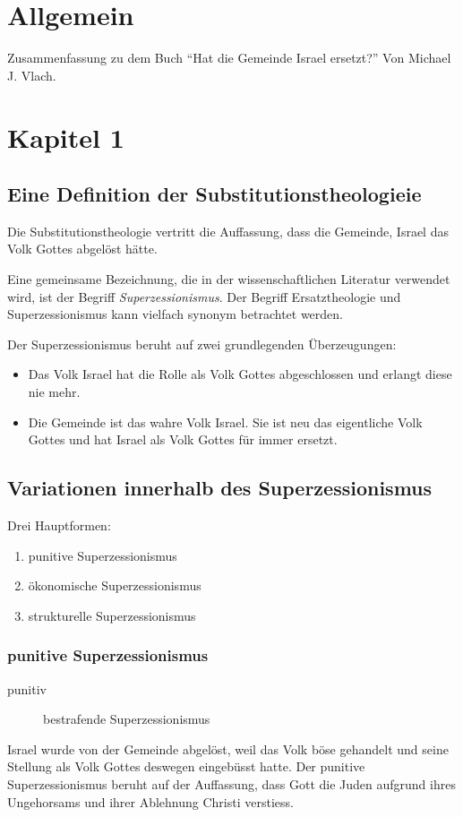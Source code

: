 \documentclass[fontsize=14pt]{../../inc/mybib}
\newcommand{\sz}{Superzessionismus}
\newcommand{\sts}{Substitutionstheologie}
\begin{document}
    \tableofcontents
    \newpage
    \section{Allgemein}
    Zusammenfassung zu dem Buch \enquote{Hat die Gemeinde Israel ersetzt?} Von Michael J. Vlach.
    \section{Kapitel 1}
    \subsection{Eine Definition der \sts{}ie}
    Die Substitutionstheologie vertritt die Auffassung, dass die Gemeinde, Israel das Volk Gottes abgelöst hätte.

    Eine gemeinsame Bezeichnung, die in der wissenschaftlichen Literatur verwendet wird, ist der Begriff \textit{\sz}. Der Begriff Ersatztheologie und \sz{} kann vielfach synonym betrachtet werden.

    Der \sz{} beruht auf zwei grundlegenden Überzeugungen:
    \begin{itemize}
        \item Das Volk Israel hat die Rolle als Volk Gottes abgeschlossen und erlangt diese nie mehr.
        \item Die Gemeinde ist das wahre Volk Israel. Sie ist neu das eigentliche Volk Gottes und hat Israel als Volk Gottes für immer ersetzt.
    \end{itemize}
    \subsection{Variationen innerhalb des \sz{}}
    Drei Hauptformen:
    \begin{enumerate}
        \item punitive \sz
        \item ökonomische \sz
        \item strukturelle \sz
    \end{enumerate}
    \subsubsection{punitive \sz}
    \begin{description}
        \item[punitiv] bestrafende \sz 
    \end{description}
    Israel wurde von der Gemeinde abgelöst, weil das Volk böse gehandelt und seine Stellung als Volk Gottes deswegen eingebüsst hatte.
    Der punitive \sz{} beruht auf der Auffassung, dass Gott die Juden aufgrund ihres Ungehorsams und ihrer Ablehnung Christi verstiess.
    
\end{document}
